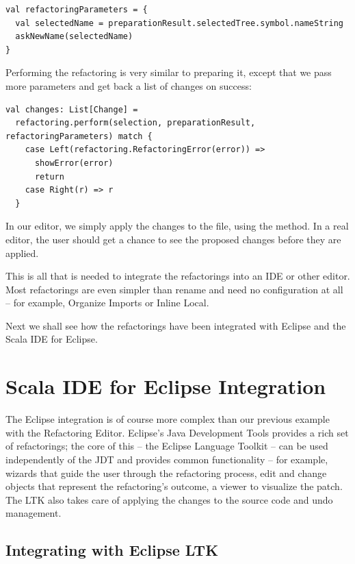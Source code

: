 \documentclass[10pt,a4paper,oneside]{scrreprt}
\begin{document}
\begin{lstlisting}
val refactoringParameters = {
  val selectedName = preparationResult.selectedTree.symbol.nameString
  askNewName(selectedName)
}
\end{lstlisting}

Performing the refactoring is very similar to preparing it, except that we pass more parameters and get back a list of changes on success:

\begin{lstlisting}
val changes: List[Change] = 
  refactoring.perform(selection, preparationResult, refactoringParameters) match {
    case Left(refactoring.RefactoringError(error)) => 
      showError(error)
      return
    case Right(r) => r
  }
\end{lstlisting}

In our editor, we simply apply the changes to the file, using the  method. In a real editor, the user should get a chance to see the proposed changes before they are applied.

This is all that is needed to integrate the refactorings into an IDE or other editor. Most refactorings are even simpler than rename and need no configuration at all -- for example, Organize Imports or Inline Local.

Next we shall see how the refactorings have been integrated with Eclipse and the Scala IDE for Eclipse.

\section{Scala IDE for Eclipse Integration}

The Eclipse integration is of course more complex than our previous example with the Refactoring Editor. Eclipse's Java Development Tools provides a rich set of refactorings; the core of this -- the Eclipse Language Toolkit \cite{LTK} -- can be used independently of the JDT and provides common functionality -- for example, wizards that guide the user through the refactoring process, edit and change objects that represent the refactoring's outcome, a viewer to visualize the patch. The LTK also takes care of applying the changes to the source code and undo management. 

\subsection{Integrating with Eclipse LTK}
\end{document}
